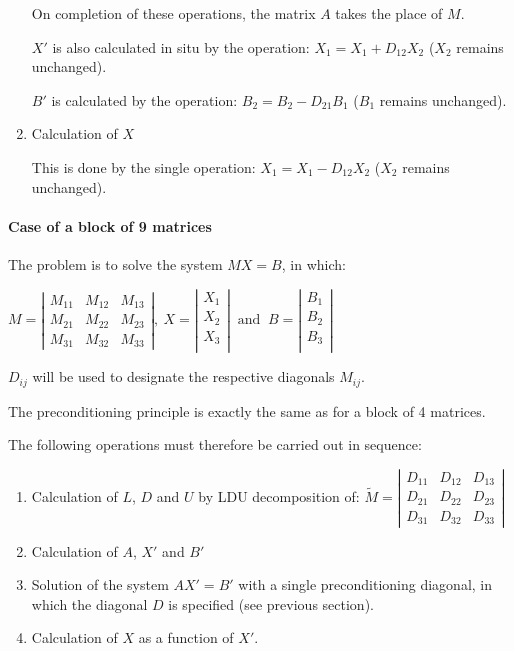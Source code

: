 \begin{enumerate}
On completion of these operations, the matrix $A$ takes the place of $M$.

$X'$ is also calculated in situ by the operation: $X_{1} = X_{1} + D_{12} X_{2}$
($X_{2}$ remains unchanged).

$B'$ is calculated by the operation: $B_{2} = B_{2} - D_{21} B_{1}$  ($B_{1}$
remains unchanged).

\setcounter{enumi}{3}
\item Calculation of $X$

This is done by the single operation: $X_{1} = X_{1} - D_{12} X_{2}$  ($X_{2}$
remains unchanged).
\end{enumerate}

\paragraph{Case of a block of 9 matrices}

The problem is to solve the system $MX = B$, in which:

$M =
\left|
\begin{array}{ccc}
  M_{11} & M_{12} & M_{13} \\
  M_{21} & M_{22} & M_{23} \\
  M_{31} & M_{32} & M_{33}
\end{array}
\right|,
~X =
\left|
\begin{array}{ccc}
  X_{1}  \\
  X_{2}  \\
  X_{3}  \\
\end{array}
\right|
~\textrm{ and }~B =
\left|
\begin{array}{ccc}
  B_{1}  \\
  B_{2}  \\
  B_{3}  \\
\end{array}
\right|
$

$D_{ij}$  will be used to designate the respective diagonals $M_{ij}$.

The preconditioning principle is exactly the same as for a block of 4 matrices.

The following operations must therefore be carried out in sequence:

\begin{enumerate}
  \item  Calculation of $L$, $D$ and $U$ by LDU decomposition of:
    $\tilde{M}=\left|
     \begin{array}{ccc}
       {D_{11} } & {D_{12} } & {D_{13} } \\
       {D_{21} } & {D_{22} } & {D_{23} } \\
       {D_{31} } & {D_{32} } & {D_{33} }
    \end{array}\right|$
  \item Calculation of $A$, $X'$ and $B'$
  \item Solution of the system $A X' = B'$ with a single preconditioning
    diagonal, in which the diagonal $D$ is specified (see previous section).
  \item Calculation of $X$ as a function of $X'$.

\end{enumerate}

